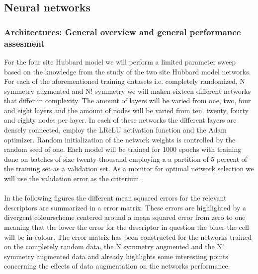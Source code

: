 \documentclass[]{article}
\begin{document}
\subsection{Neural networks}

\subsubsection{Architectures: General overview and general performance assesment}

For the four site Hubbard model we will perform a limited parameter sweep based on the knowledge from the study of the two site Hubbard model networks. For each of the aforementioned training datasets i.e. completely randomized, N symmetry augmented and N! symmetry we will maken sixteen different networks that differ in complexity. The amount of layers will be varied from one, two, four and eight layers and the amount of nodes will be varied from ten, twenty, fourty and eighty nodes per layer. In each of these networks the different layers are densely connected, employ the LReLU activation function and the Adam optimizer. Random initialization of the network weights is controlled by the random seed of one. Each model will be trained for 1000 epochs with training done on batches of size twenty-thousand employing a a partition of 5 percent of the training set as a validation set. As a monitor for optimal network selection we will use the validation error as the criterium.
\\
\\
In the following figures the different mean squared errors for the relevant descriptors are summarized in a error matrix. These errors are highlighted by a divergent colourscheme centered around a mean squared error from zero to one meaning that the lower the error for the descriptor in question the bluer the cell will be in colour. The error matrix has been constructed for the networks trained on the completely random data, the N symmetry augmented and the N! symmetry augmented data and already highlights some interesting points concerning the effects of data augmentation on the networks performance. 
\\
\\
\end{document}
